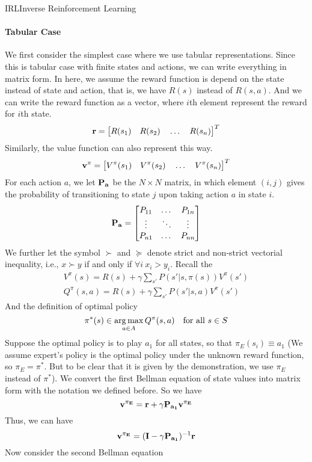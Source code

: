 \documentclass[9pt]{article}
\begin{document}
\begin{topic}{IRL}{Inverse Reinforcement Learning}
\paragraph{Tabular Case} We first consider the simplest case where we use tabular representations. Since this is tabular case with finite states and actions, we can write everything in matrix form. In here, we assume the reward function is depend on the state instead of state and action, that is, we have $R(s)$ instead of $R(s,a)$. And we can write the reward function as a vector, where $i$th element represent the reward for $i$th state.
\[
	\mathbf{r} = \big[R(s_1) \quad R(s_2) \quad \dots \quad R(s_n)\big]^{T}
\]
Similarly, the value function can also represent this way.
\[
	\mathbf{v^\pi} =  \big[V^{\pi}(s_1) \quad V^{\pi}(s_2) \quad \dots \quad V^{\pi}(s_n)\big]^{T}
\]
For each action $a$, we let $\mathbf{P_a}$ be the $N\times N$ matrix, in which element $(i,j)$ gives the probability of transitioning to state $j$ upon taking action $a$ in state $i$.
\[
\mathbf{P_a} = \begin{bmatrix} 
    P_{11} & \dots & P_{1n}\\
    \vdots & \ddots & \vdots\\
    P_{n1} &\dots   & P_{nn} 
    \end{bmatrix}
\]
We further let the symbol $\succ$ and $\succeq$ denote strict and non-strict vectorial inequality, i.e., $x\succ y$ if and only if $\forall i \  x_i > y_i$. Recall the 
\[
\begin{split}
V^{\pi}(s) = R(s) + \gamma \sum_{s'}P(s'|s,\pi(s))V^{\pi}(s')\\
Q^{\pi}(s,a) = R(s) + \gamma \sum_{s'}P(s'|s,a)V^{\pi}(s')
\end{split}
\]
And the definition of optimal policy
\[
	\pi^*(s) \in \operatorname*{arg\,max}_{a\in A}Q^{\pi}(s,a) \quad \text{for all } s \in S
\]
Suppose the optimal policy is to play $a_1$ for all states, so that $\pi_E(s_i)\equiv a_1$ (We assume expert's policy is the optimal policy under the unknown reward function, so $\pi_E = \pi^*$. But to be clear that it is given by the demonstration, we use $\pi_E$ instead of $\pi^*$). We convert the first Bellman equation of state values into matrix form with the notation we defined before. So we have 
\[
\mathbf{v^{\pi_E}} = \mathbf{r} + \gamma\mathbf{P_{a_1}}\mathbf{v^{\pi_E}}
\]
Thus, we can have 
\[
\mathbf{v^{\pi_E}} = (\mathbf{I} - \gamma\mathbf{P_{a_1}})^{-1} \mathbf{r}
\]
Now consider the second Bellman equation
\begin{equation}
\label{eq:irlt}

\end{equation}
\end{topic}
\end{document}
